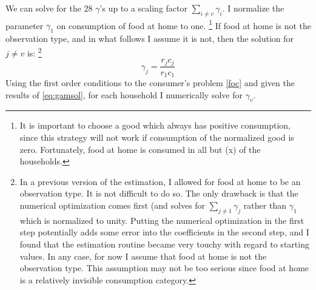 \documentclass{article}
\begin{document}
We can solve for the 28 $\gamma$'s up to a scaling factor $\sum_{i\neq v}\gamma_i$.
I normalize the parameter $\gamma_1$ on consumption of food at home to one. 
\footnote{It is important to choose a good which always has positive consumption, since this strategy will not work if consumption of the normalized good is zero.  
Fortunately, food at home is consumed in all but (x) of the households.}
If food at home is not the observation type, and in what follows I assume it is not, then the solution for $j \neq v$ is:
\footnote{In a previous version of the estimation, I allowed for food at home to be an observation type.
It is not difficult to do so.
The only drawback is that the numerical optimization comes first (and solves for $\sum_{j \neq 1} \gamma_j$ rather than $\gamma_1$ which is normalized to unity.  
Putting the numerical optimization in the first step potentially adds some error into the coefficients in the second step, and I found that the estimation routine became very touchy with regard to starting values.
In any case, for now I assume that food at home is not the observation type.
This assumption may not be too serious since food at home is a relatively invisible consumption category.
}
\begin{equation}
	\label{eq:gamsol}
	\gamma_j = \frac{r_j c_j}{r_1 c_1}
\end{equation}
Using the first order conditions to the consumer's problem \eqref{foc} and given the results of \eqref{eq:gamsol}, for each household I numerically solve for  $\gamma_v$.
%
\end{document}
